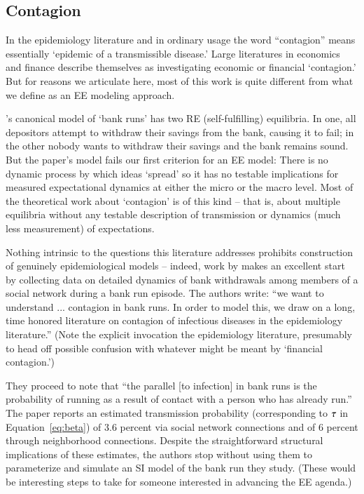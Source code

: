 
\subsection{Contagion}\label{subsec:Contagion}

In the epidemiology literature and in ordinary usage the word ``contagion'' means essentially `epidemic of a transmissible disease.'  Large literatures in economics and finance describe themselves as investigating economic or financial `contagion.'  But for reasons we articulate here, most of this work is quite different from what we define as an EE modeling approach.


\href{https://www.jstor.org/stable/1837095}{\cite{diamond_bank_1983}}'s canonical model of `bank runs' has two RE (self-fulfilling) equilibria.  In one, all depositors attempt to withdraw their savings from the bank, causing it to fail; in the other nobody wants to withdraw their savings and the bank remains sound.  But the paper's model fails our first criterion for an EE model: There is no dynamic process by which ideas `spread' so it has no testable implications for measured expectational dynamics at either the micro or the macro level.  Most of the theoretical work about `contagion' is of this kind -- that is, about multiple equilibria without any testable description of transmission or dynamics (much less measurement) of expectations.

Nothing intrinsic to the questions this literature addresses prohibits construction of genuinely epidemiological models -- indeed, work by \cite{iyer2012understanding} makes an excellent start by collecting data on detailed dynamics of bank withdrawals among members of a social network during a bank run episode.  The authors write:
``we want to understand ... contagion in bank runs. In order to model this, we draw on a long, time honored literature on contagion of infectious diseases in the epidemiology literature.''   (Note the explicit invocation the epidemiology literature, presumably to head off possible confusion with whatever might be meant by `financial contagion.')

They proceed to note that ``the parallel [to infection] in bank runs is the probability of running as a result of contact with a person who has already run.''  The paper reports an estimated transmission probability (corresponding to  $\tau$ in Equation~\ref{eq:beta}) of 3.6 percent via social network connections and of 6 percent through neighborhood connections. Despite the straightforward structural implications of these estimates, the authors stop without using them to parameterize and simulate an SI model of the bank run they study. (These would be interesting steps to take for someone interested in advancing the EE agenda.)


